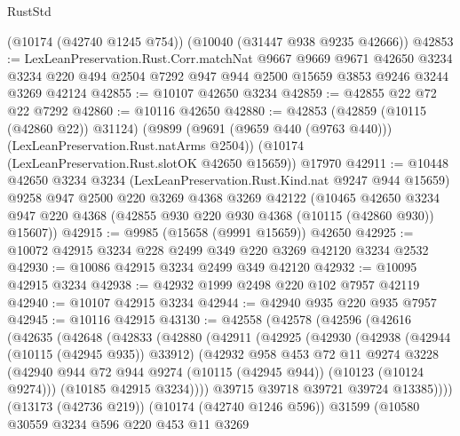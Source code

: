\begin{lexlean}{RustStd}
\begin{coremodule}
    (@10174 (@42740 @1245 @754))
    (@10040 (@31447 @938 @9235 @42666))
@42853 := LexLeanPreservation.Rust.Corr.matchNat
    @9667
    @9669
    @9671
    @42650
    @3234
    @3234
    @220
    @494
    @2504
    @7292
    @947
    @944
    @2500
    @15659
    @3853
    @9246
    @3244
    @3269
    @42124
@42855 := @10107 @42650 @3234
@42859 := @42855 @22 @72 @22 @7292
@42860 := @10116 @42650
@42880 := @42853
    (@42859 (@10115 (@42860 @22)) @31124)
    (@9899 (@9691 (@9659 @440 (@9763 @440))) (LexLeanPreservation.Rust.natArms @2504))
    (@10174 (LexLeanPreservation.Rust.slotOK @42650 @15659))
    @17970
@42911 := @10448
    @42650
    @3234
    @3234
    (LexLeanPreservation.Rust.Kind.nat @9247 @944 @15659)
    @9258
    @947
    @2500
    @220
    @3269
    @4368
    @3269
    @42122
    (@10465
      @42650
      @3234
      @947
      @220
      @4368
      (@42855 @930 @220 @930 @4368 (@10115 (@42860 @930)) @15607))
@42915 := @9985 (@15658 (@9991 @15659)) @42650
@42925 := @10072 @42915 @3234 @228 @2499 @349 @220 @3269 @42120 @3234 @2532
@42930 := @10086 @42915 @3234 @2499 @349 @42120
@42932 := @10095 @42915 @3234
@42938 := @42932 @1999 @2498 @220 @102 @7957 @42119
@42940 := @10107 @42915 @3234
@42944 := @42940 @935 @220 @935 @7957
@42945 := @10116 @42915
@43130 := @42558
    (@42578
      (@42596
        (@42616
          (@42635
            (@42648
              (@42833
                (@42880
                  (@42911
                    (@42925
                      (@42930
                        (@42938
                          (@42944 (@10115 (@42945 @935)) @33912)
                          (@42932
                            @958
                            @453
                            @72
                            @11
                            @9274
                            @3228
                            (@42940
                              @944
                              @72
                              @944
                              @9274
                              (@10115 (@42945 @944))
                              (@10123 (@10124 @9274)))
                            (@10185 @42915 @3234))))
                      @39715
                      @39718
                      @39721
                      @39724
                      @13385))))
              (@13173 (@42736 @219))
              (@10174 (@42740 @1246 @596))
              @31599
              (@10580
                @30559
                @3234
                @596
                @220
                @453
                @11
                @3269

\end{coremodule}
\end{lexlean}
